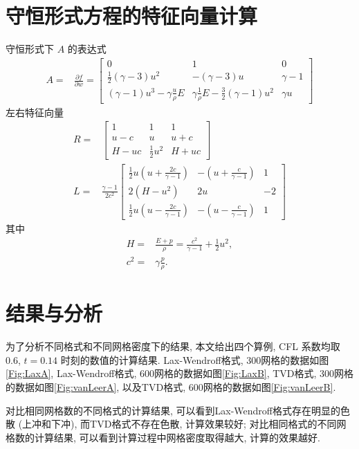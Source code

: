 \documentclass[10.5pt
]{article}
\begin{document}
\section{守恒形式方程的特征向量计算}\label{Appendix}
守恒形式下 $A$ 的表达式
\begin{align*}
A =& \frac{\partial f}{\partial w} = \left[\begin{array}{ccc} 0 & 1 & 0
\\
\frac{1}{2} (\gamma  - 3) u^2 & -(\gamma - 3) u & \gamma - 1
\\
(\gamma - 1) u^3 - \gamma \frac{u}{\rho} E & \gamma \frac{1}{\rho} E-\frac{3}{2} (\gamma
- 1) u^2 & \gamma u
\end{array}
\right]
\end{align*}
左右特征向量
\begin{align*}
R =& \left[\begin{array}{ccc} 1 & 1 & 1
\\
u - c & u & u + c
\\
H - u c & \frac{1}{2} u^2 & H + u c
\end{array}
\right]
\\
L =& \frac{\gamma - 1}{2 c^2} \left[\begin{array}{ccc} \frac{1}{2} u \left(u + \frac{2
	c}{\gamma - 1}\right) & -\left(u + \frac{c}{\gamma - 1}\right) & 1
\\
2(H - u^2) & 2 u & - 2
\\
\frac{1}{2} u \left(u - \frac{2 c}{\gamma - 1}\right) & -\left(u - \frac{c}{\gamma -
	1}\right) & 1
\end{array}
\right]
\end{align*}
其中
\begin{align*}
H =& \frac{E + p}{\rho} = \frac{c^2}{\gamma - 1} + \frac{1}{2} u^2,
\\
c^2 =& \gamma \frac{p}{\rho}.
\end{align*}

\section{结果与分析}
为了分析不同格式和不同网格密度下的结果, 本文给出四个算例, CFL 系数均取0.6, $t=0.14$ 时刻的数值的计算结果. Lax-Wendroff格式, 300网格的数据如图\ref{Fig:LaxA}, Lax-Wendroff格式, 600网格的数据如图\ref{Fig:LaxB}, TVD格式, 300网格的数据如图\ref{Fig:vanLeerA}, 以及TVD格式, 600网格的数据如图\ref{Fig:vanLeerB}. 

对比相同网格数的不同格式的计算结果, 可以看到Lax-Wendroff格式存在明显的色散 (上冲和下冲), 而TVD格式不存在色散, 计算效果较好; 对比相同格式的不同网格数的计算结果, 可以看到计算过程中网格密度取得越大, 计算的效果越好.
\end{document}

